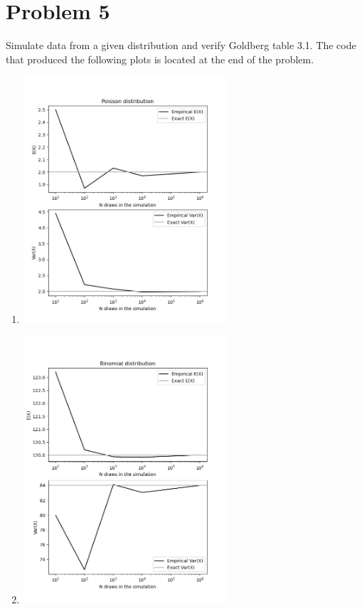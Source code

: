 \documentclass{article}
\newcommand{\1}{\mathbf{1}}
\begin{document}
\section*{Problem 5}
Simulate data from a given distribution and verify Goldberg table 3.1. The code that produced the following plots is located at the end of the problem.
\begin{enumerate}
    \item 
    \begin{center}
    \includegraphics[width=3in]{STATS509/HW2/HW2Figures/problem5a.png}
    \end{center}
     \item 
    \begin{center}
    \includegraphics[width=3in]{STATS509/HW2/HW2Figures/problem5b.png}
    \end{center}
\end{enumerate}
\newpage

\end{document}
